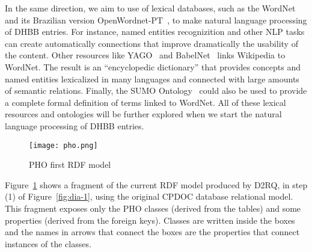 In the same direction, we aim to use of lexical databases, such as the
WordNet~\cite{wordnet} and its Brazilian version
OpenWordnet-PT~\cite{wordnet-br}, to make natural language processing
of DHBB entries. For instance, named entities recognizition and other
NLP tasks can create automatically connections that improve
dramatically the usability of the content.
Other resources like YAGO~\cite{yago} and BabelNet~\cite{babelnet}
links Wikipedia to WordNet. The result is an ``encyclopedic
dictionary'' that provides concepts and named entities lexicalized in
many languages and connected with large amounts of semantic
relations. Finally, the SUMO Ontology~\cite{sumo} could also be used
to provide a complete formal definition of terms linked to
WordNet. All of these lexical resources and ontologies will be further
explored when we start the natural language processing of DHBB
entries.


\begin{figure}[htbp]
  \centering
  \texttt{[image: pho.png]}
  \caption{PHO first RDF model}\label{fig:pho}
\end{figure}

Figure~\ref{fig:pho} shows a fragment of the current RDF model
produced by D2RQ, in step (1) of Figure~\ref{fig:dia-1}, using the
original CPDOC database relational model. This fragment exposes only
the PHO classes (derived from the tables) and some properties (derived
from the foreign keys). Classes are written inside the boxes and the
names in arrows that connect the boxes are the properties that connect
instances of the classes.

